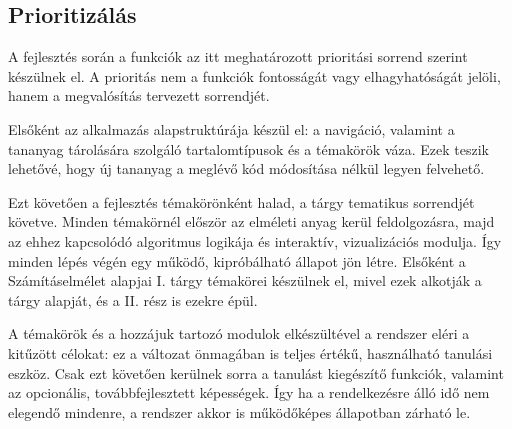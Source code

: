 \documentclass[12pt,a4paper]{report}
\begin{document}
\subsection{Prioritizálás}
A fejlesztés során a funkciók az itt meghatározott prioritási sorrend
szerint készülnek el. A prioritás nem a funkciók fontosságát vagy
elhagyhatóságát jelöli, hanem a megvalósítás tervezett sorrendjét.

Elsőként az alkalmazás alapstruktúrája készül el: a navigáció, valamint
a tananyag tárolására szolgáló tartalomtípusok és a témakörök váza.
Ezek teszik lehetővé, hogy új tananyag a meglévő kód módosítása nélkül
legyen felvehető.

Ezt követően a fejlesztés témakörönként halad, a tárgy tematikus
sorrendjét követve. Minden témakörnél először az elméleti anyag kerül
feldolgozásra, majd az ehhez kapcsolódó algoritmus logikája és
interaktív, vizualizációs modulja. Így minden lépés végén egy működő,
kipróbálható állapot jön létre. Elsőként a Számításelmélet alapjai I.
tárgy témakörei készülnek el, mivel ezek alkotják a tárgy alapját,
és a II. rész is ezekre épül.

A témakörök és a hozzájuk tartozó modulok elkészültével a rendszer
eléri a kitűzött célokat: ez a változat önmagában is teljes értékű,
használható tanulási eszköz. Csak ezt követően kerülnek sorra a
tanulást kiegészítő funkciók, valamint az opcionális, továbbfejlesztett
képességek. Így ha a rendelkezésre álló idő nem elegendő mindenre,
a rendszer akkor is működőképes állapotban zárható le.


\end{document}
